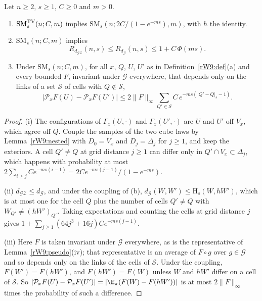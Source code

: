 \begin{proposition}\label{rW9:hierarchy}
Let $n\ge2$, $s\ge1$, $C\ge0$ and $m>0$.
\begin{enumerate}[label=\textup{(\roman*)},leftmargin=*]
\item $\mathrm{SM}^{\rm TV}_s(n;C,m)$ implies $\mathrm{SM}_s(n;2C/(1-e^{-ms}),
m)$, with $h$ the identity.
\item $\mathrm{SM}_s(n;C,m)$ implies
\[
R_{d_{\mathcal{GZ}}}(n,s)\le R_{d_{\mathcal G}}(n,s)\le1+C\,\Phi(ms).
\]
\item Under $\mathrm{SM}_s(n;C,m)$, for all $x$, $Q$, $U$, $U'$ as in
Definition~\ref{rW9:def}\textup{(a)} and every bounded $F$, invariant under
$\mathcal G$ everywhere, that depends only on the links of a set $\mathcal S$
of cells with $Q\notin\mathcal S$,
\[
\bigl\lvert\mathcal P_xF(U)-\mathcal P_xF(U')\bigr\rvert\le2\lVert F\rVert_
\infty\sum_{Q'\in\mathcal S}C\,e^{-ms(\lvert Q'-Q\rvert_s-1)} .
\]
\end{enumerate}
\end{proposition}

\begin{proof}
(i) The configurations of $\Gamma_x(U,\cdot)$ and $\Gamma_x(U',\cdot)$ are
$U$ and $U'$ off $V_x$, which agree off $Q$. Couple the samples of the two
cube laws by Lemma~\ref{rW9:nested} with $D_0=V_x$ and $D_j=\Delta_j$ for
$j\ge1$, and keep
the exteriors. A cell $Q'\ne Q$ at grid distance $j\ge1$ can differ only in
$Q'\cap V_x\subset\Delta_j$, which happens with probability at most
$2\sum_{i\ge j}Ce^{-ms(i-1)}=2Ce^{-ms(j-1)}/(1-e^{-ms})$.

(ii) $d_{\mathcal{GZ}}\le d_{\mathcal G}$, and under the coupling of (b),
$d_{\mathcal G}(W,W')\le\mathrm H_s(W,hW')$, which is at most one for the
cell $Q$ plus the number of cells $Q'\ne Q$ with $W_{Q'}\ne(hW')_{Q'}$.
Taking expectations and counting the cells at grid distance $j$ gives
$1+\sum_{j\ge1}(64j^3+16j)Ce^{-ms(j-1)}$.

(iii) Here $F$ is taken invariant under $\mathcal G$ everywhere, as
is the representative of Lemma~\ref{rW9:pseudo}(iv); that representative is
an average of $F\circ g$ over $g\in\mathcal G$ and so depends only on the
links of the cells of $\mathcal S$. Under the coupling, $F(W')=F(hW')$, and
$F(hW')=F(W)$ unless $W$ and $hW'$ differ on a cell of $\mathcal S$. So
$\lvert\mathcal P_xF(U)-\mathcal P_xF(U')\rvert=\lvert\E_\pi(F(W)-F(hW'))
\rvert$ is at most $2\lVert F\rVert_\infty$ times the probability of such a
difference.
\end{proof}

